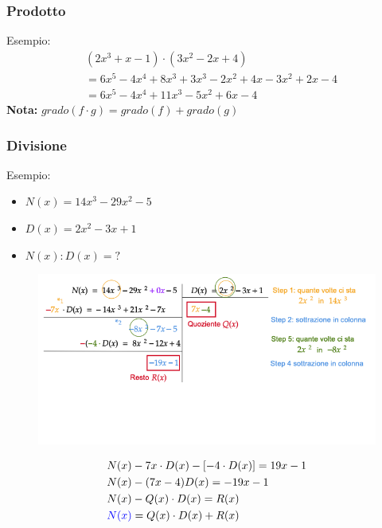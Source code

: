 \documentclass[../main.tex]{subfiles}
\begin{document}
\subsubsection{Prodotto}
Esempio:
\begin{align*}
    &(2x^3 + x - 1) \cdot (3x^2 -2x + 4) \\
    &= 6x^5 - 4x^4 + 8x^3 + 3x^3 - 2x^2 + 4x - 3x^2 + 2x -4 \\
    &= 6x^5 - 4x^4 + 11x^3 -5x^2 + 6x -4
\end{align*}
\textbf{Nota:} $grado(f \cdot g) = grado(f) + grado(g)$

\subsubsection{Divisione}
Esempio:
\begin{itemize}
    \item $N(x) = 14x^3 -29x^2 -5$
    \item $D(x) = 2x^2 -3x + 1$
    \item $N(x) : D(x) = ?$
\end{itemize}
\begin{figure}[h]
    \centering
    \includegraphics[width=1\textwidth]{images/divisionePolinomiale.png}
\end{figure}

\begin{align*}
    N(x)& - 7x \cdot D(x) - [ -4 \cdot D(x) ]  = 19x -1 \\
    N(x)& -(7x-4) D(x) = -19x-1 \\
    N(x)& - Q(x) \cdot D(x) = R(x) \\
    \color{blue}N(x)& = Q(x) \cdot D(x) + R(x)
\end{align*}
\end{document}
